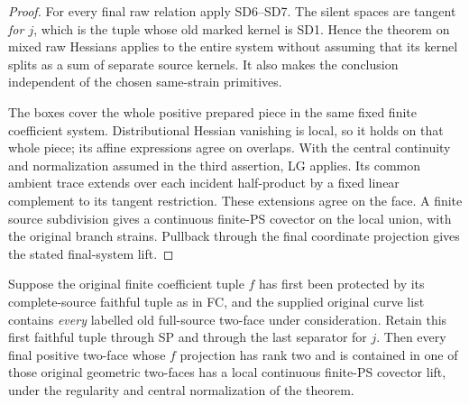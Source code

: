 \begin{proof}
For every final raw relation apply SD6--SD7.  The silent spaces
are tangent \emph{for $j$}, which is the tuple whose old marked
kernel is SD1.  Hence the theorem on mixed raw Hessians applies
to the entire system without assuming that its kernel splits
as a sum of separate source kernels.  It also makes the
conclusion independent of the chosen same-strain primitives.

The boxes cover the whole positive prepared piece in the same
fixed finite coefficient system.  Distributional Hessian
vanishing is local, so it holds on that whole piece; its affine
expressions agree on overlaps.  With the central continuity and
normalization assumed in the third assertion, LG applies.  Its
common ambient trace extends over each incident half-product by
a fixed linear complement to its tangent restriction.  These
extensions agree on the face.  A finite source subdivision gives
a continuous finite-PS covector on the local union, with the
original branch strains.  Pullback through the final coordinate
projection gives the stated final-system lift.
\end{proof}

\begin{corollary}
\label{cor:r13-sd-complete-original-two-face-inventory}
Suppose the original finite coefficient tuple $f$ has first been
protected by its complete-source faithful tuple as in FC, and
the supplied original curve list contains \emph{every} labelled
old full-source two-face under consideration.  Retain this
first faithful tuple through SP and through the last separator
for $j$.  Then every final positive two-face whose $f$ projection
has rank two and is contained in one of those original geometric
two-faces has a local continuous finite-PS covector lift, under
the regularity and central normalization of the theorem.
\end{corollary}

